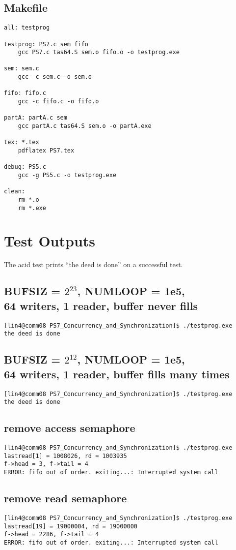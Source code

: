 \documentclass[12pt]{article}
\begin{document}
\subsection{Makefile}

\begin{lstlisting}
all: testprog

testprog: PS7.c sem fifo
    gcc PS7.c tas64.S sem.o fifo.o -o testprog.exe

sem: sem.c
    gcc -c sem.c -o sem.o

fifo: fifo.c
    gcc -c fifo.c -o fifo.o

partA: partA.c sem
    gcc partA.c tas64.S sem.o -o partA.exe

tex: *.tex
    pdflatex PS7.tex

debug: PS5.c
    gcc -g PS5.c -o testprog.exe

clean:
    rm *.o
    rm *.exe
\end{lstlisting}

\section {Test Outputs}

The acid test prints ``the deed is done'' on a successful test.

\subsection {BUFSIZ = $2^{23}$, NUMLOOP = 1e5, \\
64 writers, 1 reader, buffer never fills}
\begin{lstlisting}
[lin4@comm08 PS7_Concurrency_and_Synchronization]$ ./testprog.exe 
the deed is done
\end{lstlisting}

\subsection {BUFSIZ = $2^{12}$, NUMLOOP = 1e5, \\
64 writers, 1 reader, buffer fills many times}
\begin{lstlisting}
[lin4@comm08 PS7_Concurrency_and_Synchronization]$ ./testprog.exe 
the deed is done
\end{lstlisting}

\subsection {remove access semaphore}
\begin{lstlisting}
[lin4@comm08 PS7_Concurrency_and_Synchronization]$ ./testprog.exe 
lastread[1] = 1008026, rd = 1003935
f->head = 3, f->tail = 4
ERROR: fifo out of order. exiting...: Interrupted system call
\end{lstlisting}

\subsection {remove read semaphore}
\begin{lstlisting}
[lin4@comm08 PS7_Concurrency_and_Synchronization]$ ./testprog.exe 
lastread[19] = 19000004, rd = 19000000
f->head = 2286, f->tail = 4
ERROR: fifo out of order. exiting...: Interrupted system call
\end{lstlisting}
\end{document}

